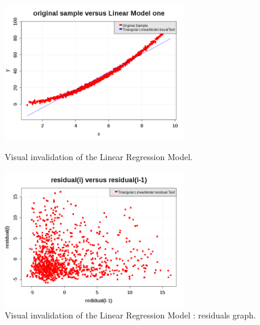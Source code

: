 \begin{figure}[H]
  \begin{minipage}{8cm}
    \begin{center}
      \includegraphics[width=8cm]{linearRegression_GraphWrong.png}
      \caption{Visual invalidation of the Linear Regression Model.}
      \label{LMWrong}
    \end{center}
  \end{minipage}
  \hfill
  \begin{minipage}{8cm}
    \begin{center}
      \includegraphics[width=8cm]{linearRegression_residualGraphWrong.png}
      \caption{Visual invalidation of the Linear Regression Model : residuals graph.}
      \label{LMResidualWrong}
    \end{center}
  \end{minipage}
\end{figure}


